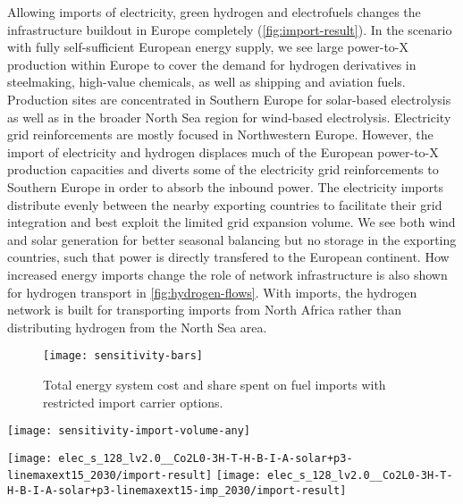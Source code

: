 \documentclass[10pt,5p,reversenotenum,lefttitle]{elsarticle}
\begin{document}
Allowing imports of electricity, green hydrogen and electrofuels changes the
infrastructure buildout in Europe completely (\cref{fig:import-result}). In the
scenario with fully self-sufficient European energy supply, we see large
\mbox{power-to-X} production within Europe to cover the demand for hydrogen
derivatives in steelmaking, high-value chemicals, as well as shipping and
aviation fuels. Production sites are concentrated in Southern Europe for
solar-based electrolysis as well as in the broader North Sea region for
wind-based electrolysis. Electricity grid reinforcements are mostly focused in
Northwestern Europe. However, the import of electricity and hydrogen displaces
much of the European power-to-X production capacities and diverts some of the
electricity grid reinforcements to Southern Europe in order to absorb the
inbound power. The electricity imports distribute evenly between the nearby
exporting countries to facilitate their grid integration and best exploit the
limited grid expansion volume. We see both wind and solar generation for better
seasonal balancing but no storage in the exporting countries, such that power is
directly transfered to the European continent. How increased energy imports
change the role of network infrastructure is also shown for hydrogen transport
in \cref{fig:hydrogen-flows}. With imports, the hydrogen network is built for
transporting imports from North Africa rather than distributing hydrogen from
the North Sea area.

\begin{figure}
    \centering
    \texttt{[image: sensitivity-bars]}
    \caption{Total energy system cost and share spent on fuel imports with restricted import carrier options.}
    \label{fig:sensitivity-bars}
\end{figure}

\begin{figure*}
    \centering
    \texttt{[image: sensitivity-import-volume-any]}
    \vspace{-0.3cm}
    \caption{Total energy system cost and system composition with increasing energy imports.}
    \label{fig:sensitivity-import-volume-any}
\end{figure*}

\begin{figure*}
    \centering
    \texttt{[image: elec\_s\_128\_lv2.0\_\_Co2L0-3H-T-H-B-I-A-solar+p3-linemaxext15\_2030/import-result]}
    \texttt{[image: elec\_s\_128\_lv2.0\_\_Co2L0-3H-T-H-B-I-A-solar+p3-linemaxext15-imp\_2030/import-result]}
    \caption{Distribution of power grid reinforcements, synthetic fuel production and import locations for scenario without imports (left) and with imports (right).}
    \label{fig:import-result}
\end{figure*}
\end{document}
